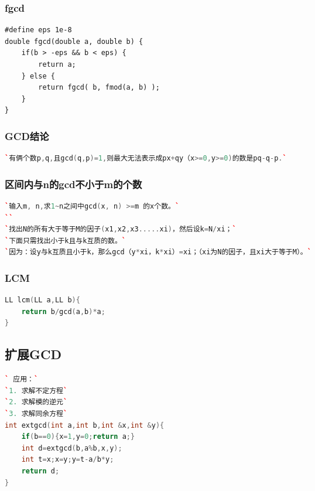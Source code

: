 \documentclass[a4paper]{article}
\begin{document}
\begin{CJK*}{UTF8}{gbsn}
\begin{multicols}{3}
\begin{flushleft}
\subsubsection{fgcd}
\begin{lstlisting}
#define eps 1e-8
double fgcd(double a, double b) {
	if(b > -eps && b < eps) {
		return a;
	} else {
		return fgcd( b, fmod(a, b) );
	}
}
\end{lstlisting}


\subsubsection{GCD结论}
\begin{lstlisting}[language={c++}]
`有俩个数p,q,且gcd(q,p)=1,则最大无法表示成px+qy（x>=0,y>=0)的数是pq-q-p.`
\end{lstlisting}

\subsubsection{区间内与n的gcd不小于m的个数 }
\begin{lstlisting}[language={c++}]
`输入m, n,求1~n之间中gcd(x, n) >=m 的x个数。`
``
`找出N的所有大于等于M的因子(x1,x2,x3.....xi)，然后设k=N/xi；`
`下面只需找出小于k且与k互质的数。`
`因为：设y与k互质且小于k，那么gcd（y*xi，k*xi）=xi；（xi为N的因子，且xi大于等于M）。`
\end{lstlisting}

\subsubsection{LCM}
\begin{lstlisting}[language={c++}]
LL lcm(LL a,LL b){
    return b/gcd(a,b)*a;
}
\end{lstlisting}


\subsection{扩展GCD}
\begin{lstlisting}[language={c++}]
` 应用：`
`1. 求解不定方程`
`2. 求解模的逆元`
`3. 求解同余方程`
int extgcd(int a,int b,int &x,int &y){
	if(b==0){x=1,y=0;return a;}
	int d=extgcd(b,a%b,x,y);
	int t=x;x=y;y=t-a/b*y;
	return d;
}
\end{lstlisting}



\end{flushleft}
\end{multicols}
\end{CJK*}
\end{document}
